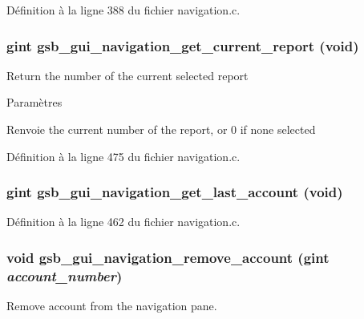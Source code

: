 Définition à la ligne 388 du fichier navigation.c.

\subsubsection[{gsb\_\-gui\_\-navigation\_\-get\_\-current\_\-report}]{\setlength{\rightskip}{0pt plus 5cm}gint gsb\_\-gui\_\-navigation\_\-get\_\-current\_\-report (void)}\label{navigation_8h_aef700722a199569003341a41144ee004}
Return the number of the current selected report


\begin{DoxyParams}{Paramètres}
\item[{\em }]\end{DoxyParams}
\begin{DoxyReturn}{Renvoie}
the current number of the report, or 0 if none selected 
\end{DoxyReturn}


Définition à la ligne 475 du fichier navigation.c.

\subsubsection[{gsb\_\-gui\_\-navigation\_\-get\_\-last\_\-account}]{\setlength{\rightskip}{0pt plus 5cm}gint gsb\_\-gui\_\-navigation\_\-get\_\-last\_\-account (void)}\label{navigation_8h_ad804dac7f03dd7f66ba7e0d43aa84165}


Définition à la ligne 462 du fichier navigation.c.

\subsubsection[{gsb\_\-gui\_\-navigation\_\-remove\_\-account}]{\setlength{\rightskip}{0pt plus 5cm}void gsb\_\-gui\_\-navigation\_\-remove\_\-account (gint {\em account\_\-number})}\label{navigation_8h_a6e9f014d077329a589843dbe3edd15de}
Remove account from the navigation pane.


